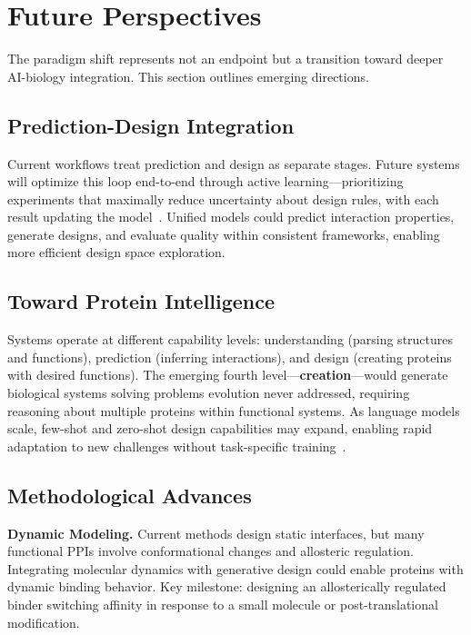 \section{Future Perspectives}
\label{sec:future}

The paradigm shift represents not an endpoint but a transition toward deeper AI-biology integration. This section outlines emerging directions.

\subsection{Prediction-Design Integration}

Current workflows treat prediction and design as separate stages. Future systems will optimize this loop end-to-end through active learning---prioritizing experiments that maximally reduce uncertainty about design rules, with each result updating the model~\cite{dallago2024plmfinetune}. Unified models could predict interaction properties, generate designs, and evaluate quality within consistent frameworks, enabling more efficient design space exploration.

\subsection{Toward Protein Intelligence}

Systems operate at different capability levels: understanding (parsing structures and functions), prediction (inferring interactions), and design (creating proteins with desired functions). The emerging fourth level---\textbf{creation}---would generate biological systems solving problems evolution never addressed, requiring reasoning about multiple proteins within functional systems. As language models scale, few-shot and zero-shot design capabilities may expand, enabling rapid adaptation to new challenges without task-specific training~\cite{lin2023esm2}.

\subsection{Methodological Advances}

\textbf{Dynamic Modeling.} Current methods design static interfaces, but many functional PPIs involve conformational changes and allosteric regulation. Integrating molecular dynamics with generative design could enable proteins with dynamic binding behavior. Key milestone: designing an allosterically regulated binder switching affinity in response to a small molecule or post-translational modification.

